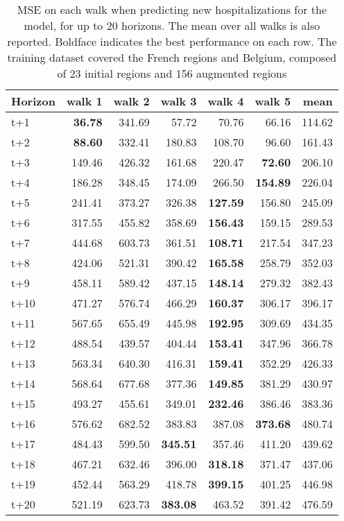 \begin{table}[H]
\centering
\caption{MSE on each walk when predicting new hospitalizations for the model, for up to 20 horizons. The mean over all walks is also reported. Boldface indicates the best performance on each row. The training dataset covered the French regions and Belgium, composed of 23 initial regions and 156 augmented regions }
\label{tab:MSE_walk_dense_model}
\begin{tabular}{lrrrrrr}
\toprule
Horizon &  walk 1 &  walk 2 &  walk 3 &  walk 4 &  walk 5 &   mean \\
\midrule
t+1  & \textbf{36.78}  & 341.69  & 57.72  & 70.76  & 66.16  & 114.62  \\
t+2  & \textbf{88.60}  & 332.41  & 180.83  & 108.70  & 96.60  & 161.43  \\
t+3  & 149.46  & 426.32  & 161.68  & 220.47  & \textbf{72.60}  & 206.10  \\
t+4  & 186.28  & 348.45  & 174.09  & 266.50  & \textbf{154.89}  & 226.04  \\
t+5  & 241.41  & 373.27  & 326.38  & \textbf{127.59}  & 156.80  & 245.09  \\
t+6  & 317.55  & 455.82  & 358.69  & \textbf{156.43}  & 159.15  & 289.53  \\
t+7  & 444.68  & 603.73  & 361.51  & \textbf{108.71}  & 217.54  & 347.23  \\
t+8  & 424.06  & 521.31  & 390.42  & \textbf{165.58}  & 258.79  & 352.03  \\
t+9  & 458.11  & 589.42  & 437.15  & \textbf{148.14}  & 279.32  & 382.43  \\
t+10  & 471.27  & 576.74  & 466.29  & \textbf{160.37}  & 306.17  & 396.17  \\
t+11  & 567.65  & 655.49  & 445.98  & \textbf{192.95}  & 309.69  & 434.35  \\
t+12  & 488.54  & 439.57  & 404.44  & \textbf{153.41}  & 347.96  & 366.78  \\
t+13  & 563.34  & 640.30  & 416.31  & \textbf{159.41}  & 352.29  & 426.33  \\
t+14  & 568.64  & 677.68  & 377.36  & \textbf{149.85}  & 381.29  & 430.97  \\
t+15  & 493.27  & 455.61  & 349.01  & \textbf{232.46}  & 386.46  & 383.36  \\
t+16  & 576.62  & 682.52  & 383.83  & 387.08  & \textbf{373.68}  & 480.74  \\
t+17  & 484.43  & 599.50  & \textbf{345.51}  & 357.46  & 411.20  & 439.62  \\
t+18  & 467.21  & 632.46  & 396.00  & \textbf{318.18}  & 371.47  & 437.06  \\
t+19  & 452.44  & 563.29  & 418.78  & \textbf{399.15}  & 401.25  & 446.98  \\
t+20  & 521.19  & 623.73  & \textbf{383.08}  & 463.52  & 391.42  & 476.59  \\

\bottomrule
\end{tabular}
\end{table}

